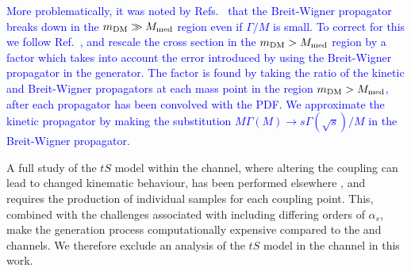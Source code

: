 \textcolor{blue}{More problematically,  it was noted by  Refs.~\cite{NordstromSVD,An:2012va} that the Breit-Wigner propagator breaks down in the $m_{\mathrm{DM}} \gg M_{\mathrm{med}}$ region even if $\Gamma/M$ is small. To correct for this we follow Ref.~\cite{NordstromSVD}, and rescale the cross section in the $m_{\mathrm{DM}} > M_{\mathrm{med}}$ region by a factor which takes into account the error introduced by using the Breit-Wigner propagator in the generator. The factor is found by taking the ratio of the kinetic and Breit-Wigner propagators at each mass point in the region $m_{\mathrm{DM}} > M_{\mathrm{med}}$, after each propagator has been convolved with the PDF. We approximate the kinetic propagator by making the substitution $M \Gamma(M) \rightarrow s \Gamma(\sqrt{s}) / M$ in the Breit-Wigner propagator. }

A full study of the $tS$ model within the \monojet channel, where altering the coupling can lead to changed kinematic behaviour, has been performed elsewhere \cite{Zurek:tchannel}, and requires the production of individual samples for each coupling point. This, combined with the challenges associated with including differing orders of $\alpha_s$, make the generation process computationally expensive compared to the \monoZ and \monoWZ channels. We therefore exclude an analysis of the $tS$ model in the \monojet channel in this work.



